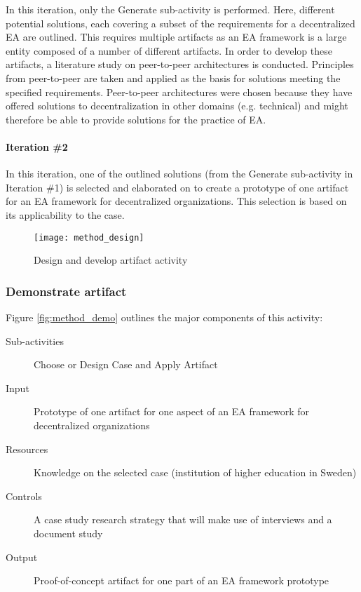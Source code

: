 In this iteration, only the Generate sub-activity is performed. Here, different potential solutions, each covering a subset of the requirements for a decentralized EA are outlined. This requires multiple artifacts as an EA framework is a large entity composed of a number of different artifacts. In order to develop these artifacts, a literature study on peer-to-peer architectures is conducted. Principles from peer-to-peer are taken and applied as the basis for solutions meeting the specified requirements. Peer-to-peer architectures were chosen because they have offered solutions to decentralization in other domains (e.g. technical) and might therefore be able to provide solutions for the practice of EA. 

\paragraph{Iteration \#2}

In this iteration, one of the outlined solutions (from the Generate sub-activity in Iteration \#1) is selected and elaborated on to create a prototype of one artifact for an EA framework for decentralized organizations. This selection is based on its applicability to the case. 

\begin{figure}
\centering
\texttt{[image: method\_design]}
\caption{Design and develop artifact activity}
\label{fig:method_design}
\end{figure}
  
\subsubsection*{Demonstrate artifact}

Figure \ref{fig:method_demo} outlines the major components of this activity:
\begin{description}
  \item[Sub-activities]  Choose or Design Case and Apply Artifact~\cite[Ch. 8]{johannessonPerjons2012}
  \item[Input] Prototype of one artifact for one aspect of an EA framework for decentralized organizations
  \item[Resources]  Knowledge on the selected case (institution of higher education in Sweden)
  \item[Controls]  A case study research strategy that will make use of interviews and a document study
  \item[Output] Proof-of-concept artifact for one part of an EA framework prototype
\end{description}

